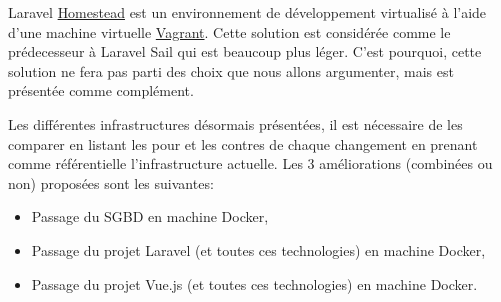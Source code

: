 \documentclass[
    iai, %
    il, %
]{heig-tb}
\begin{document}

Laravel \href{https://laravel.com/docs/9.x/homestead}{Homestead} est un environnement de développement virtualisé à l'aide d'une machine virtuelle \href{https://www.vagrantup.com/}{Vagrant}.
Cette solution est considérée comme le prédecesseur à Laravel Sail qui est beaucoup plus léger.
C'est pourquoi, cette solution ne fera pas parti des choix que nous allons argumenter, mais est présentée comme complément.



Les différentes infrastructures désormais présentées, il est nécessaire de les comparer en listant les pour et les contres de chaque changement en prenant comme référentielle l'infrastructure actuelle.
Les 3 améliorations (combinées ou non) proposées sont les suivantes:
\begin{itemize}
    \item Passage du SGBD en machine Docker,
    \item Passage du projet Laravel (et toutes ces technologies) en machine Docker,
    \item Passage du projet Vue.js (et toutes ces technologies) en machine Docker.
\end{itemize}


\end{document}

